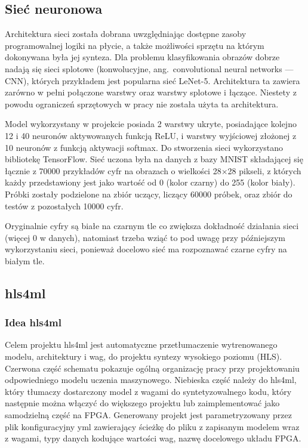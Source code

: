 \documentclass[12pt, oneside]{article}
\begin{document}
\subsection{Sieć neuronowa}
Architektura sieci została dobrana uwzględniając dostępne zasoby programowalnej
logiki na płycie, a także możliwości sprzętu na którym dokonywana była jej
synteza. Dla problemu klasyfikowania obrazów dobrze nadają się sieci
splotowe (konwolucyjne, ang.\ convolutional neural networks --- CNN), 
 których przykładem jest popularna sieć \mbox{LeNet-5}.
Architektura ta zawiera zarówno w pełni połączone warstwy
oraz warstwy splotowe i łączące.
Niestety z powodu ograniczeń sprzętowych w pracy nie została użyta ta
architektura.

Model wykorzystany w projekcie posiada 2 warstwy ukryte, posiadające kolejno
12 i 40 neuronów aktywowanych funkcją ReLU, i warstwy wyjściowej złożonej
z 10 neuronów z funkcją aktywacji softmax. Do stworzenia sieci wykorzystano
bibliotekę TensorFlow. Sieć uczona była na danych
z bazy MNIST składającej się łącznie z 70000 przykładów
cyfr na obrazach o wielkości 28\(\times \)28 pikseli, z których każdy
przedstawiony jest jako wartość od 0 (kolor czarny) do 255 (kolor biały).
Próbki zostały
podzielone na zbiór uczący, liczący 60000 próbek, oraz zbiór do testów
z pozostałych 10000 cyfr.

Oryginalnie cyfry są białe na czarnym tle co zwiększa
 dokładność działania sieci (więcej 0 w danych),
natomiast trzeba wziąć to pod uwagę przy późniejszym wykorzystaniu sieci,
ponieważ docelowo sieć ma rozpoznawać czarne cyfry na białym tle.

\subsection{hls4ml}
\subsubsection{Idea hls4ml}
Celem projektu hls4ml jest automatyczne przetłumaczenie wytrenowanego modelu,
architektury i wag, do projektu syntezy wysokiego poziomu (HLS).
Czerwona część schematu pokazuje ogólną organizację pracy przy projektowaniu 
odpowiedniego modelu uczenia maszynowego. Niebieska część należy do hls4ml,
który tłumaczy dostarczony model z wagami do syntetyzowalnego kodu, który
następnie można włączyć do większego projektu lub zaimplementować jako
samodzielną część na FPGA. Generowany projekt jest parametryzowany
przez plik konfiguracyjny yml zawierający ścieżkę do pliku z zapisanym modelem
wraz z wagami, typy danych kodujące wartości wag, nazwę docelowego układu FPGA.
\end{document}

